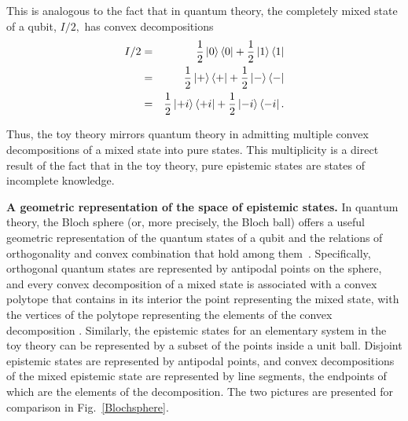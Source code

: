 \documentclass[pra,twocolumn,nofootinbib,showpacs]{revtex4}
\begin{document}
This is analogous to the fact that in quantum theory, the completely mixed
state of a qubit, $I/2,$ has convex decompositions
\begin{eqnarray}
I/2 &=&\frac{1}{2}\left| 0\right\rangle \left\langle 0\right| +\frac{1}{2}
\left| 1\right\rangle \left\langle 1\right|  \notag \\
&=&\frac{1}{2}\left| +\right\rangle \left\langle +\right| +\frac{1}{2}\left|
-\right\rangle \left\langle -\right|  \notag \\
&=&\frac{1}{2}\left| +i\right\rangle \left\langle +i\right| +\frac{1}{2}
\left| -i\right\rangle \left\langle -i\right| .
\end{eqnarray}

Thus, the toy theory mirrors quantum theory in admitting multiple convex
decompositions of a mixed state into pure states. This multiplicity is a
direct result of the fact that in the toy theory, pure epistemic states are
states of incomplete knowledge.

\textbf{A geometric representation of the space of epistemic states.} In
quantum theory, the Bloch sphere (or, more precisely, the Bloch ball) offers
a useful geometric representation of the quantum states of a qubit and the
relations of orthogonality and convex combination that hold among them~\cite%
{NielsenChuang}. Specifically, orthogonal quantum states are represented by
antipodal points on the sphere, and every convex decomposition of a mixed
state is associated with a convex polytope that contains in its interior the
point representing the mixed state, with the vertices of the polytope
representing the elements of the convex decomposition \cite%
{SpekkensRudolphQIC}. Similarly, the epistemic states for an elementary
system in the toy theory can be represented by a subset of the points inside
a unit ball. Disjoint epistemic states are represented by antipodal points,
and convex decompositions of the mixed epistemic state are represented by
line segments, the endpoints of which are the elements of the decomposition.
The two pictures are presented for comparison in Fig.~\ref{Blochsphere}.
\end{document}
